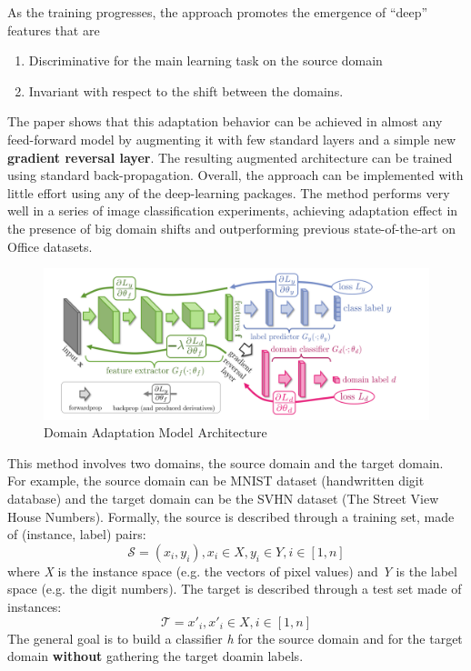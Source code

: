 As the training progresses, the approach promotes the emergence of “deep” features that are
\begin{enumerate}
	\item Discriminative for the main learning task on the source domain
	\item Invariant with respect to the shift between the domains.
\end{enumerate} 
The paper\cite{ganin2014unsupervised} shows that this adaptation behavior can be achieved in almost any feed-forward model by augmenting it with few standard layers and a simple new \textbf{gradient reversal layer}. The resulting augmented architecture can be trained using standard back-propagation. Overall, the approach can be implemented with little effort using any of the deep-learning packages. The method performs very well in a series of image classification experiments, achieving adaptation effect in the presence of big domain shifts and outperforming previous state-of-the-art on Office datasets.

\begin{figure}[htbp]
	\centering
	\includegraphics[width=15cm]{Figures/domainadaptation.png}
	\caption[Domain Adaptation Model Architecture]{Domain Adaptation Model Architecture}
	\label{fig:domainadaptation}
\end{figure}

This method involves two domains, the source domain and the target domain.  For example, the source domain can be MNIST dataset (handwritten digit database) and the target domain can be the SVHN dataset (The Street View House Numbers). Formally, the source is described through a training set, made of (instance, label) pairs:
\[ \mathcal{ S} = {(x_{i},y_{i}), x_{i} \in X, y_{i} \in Y, i \in [1,n]}  \]
where \textit{X} is the instance space (e.g. the vectors of pixel values) and \textit{Y} is the label space (e.g. the digit numbers). The target is described through a test set made of instances:
\[ \mathcal{T} = x'_{i}, x'_{i} \in X, i \in [1,n] \]
The general goal is to build a classifier \textit{h} for the source domain and for the target domain \textbf{without} gathering the target doamin labels.

